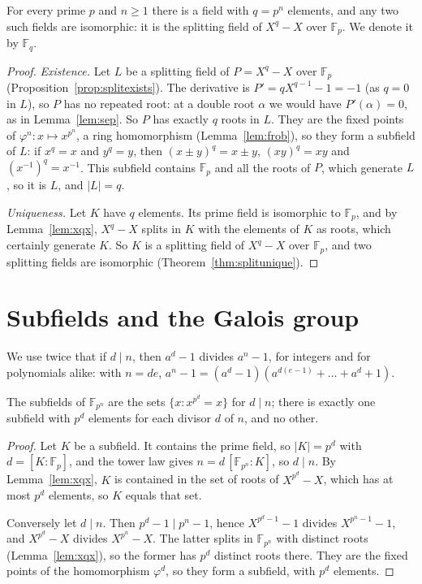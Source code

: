 \begin{theorem}\label{thm:fq}
For every prime $p$ and $n\ge1$ there is a field with $q=p^n$ elements, and any two such fields are isomorphic: it is the splitting field of $X^q-X$ over $\mathbb F_p$. We denote it by $\mathbb F_q$.
\end{theorem}
\begin{proof}
\emph{Existence.} Let $L$ be a splitting field of $P=X^q-X$ over $\mathbb F_p$ (Proposition~\ref{prop:splitexists}). The derivative is $P'=qX^{q-1}-1=-1$ (as $q=0$ in $L$), so $P$ has no repeated root: at a double root $\alpha$ we would have $P'(\alpha)=0$, as in Lemma~\ref{lem:sep}. So $P$ has exactly $q$ roots in $L$. They are the fixed points of $\varphi^n:x\mapsto x^{p^n}$, a ring homomorphism (Lemma~\ref{lem:frob}), so they form a subfield of $L$: if $x^q=x$ and $y^q=y$, then $(x\pm y)^q=x\pm y$, $(xy)^q=xy$ and $(x^{-1})^q=x^{-1}$. This subfield contains $\mathbb F_p$ and all the roots of $P$, which generate $L$, so it is $L$, and $|L|=q$.

\emph{Uniqueness.} Let $K$ have $q$ elements. Its prime field is isomorphic to $\mathbb F_p$, and by Lemma~\ref{lem:xqx}, $X^q-X$ splits in $K$ with the elements of $K$ as roots, which certainly generate $K$. So $K$ is a splitting field of $X^q-X$ over $\mathbb F_p$, and two splitting fields are isomorphic (Theorem~\ref{thm:splitunique}).
\end{proof}

\section{Subfields and the Galois group}

We use twice that if $d\mid n$, then $a^d-1$ divides $a^n-1$, for integers and for polynomials alike: with $n=de$, $a^n-1=(a^d-1)(a^{d(e-1)}+\dots+a^d+1)$.

\begin{theorem}\label{thm:subfields}
The subfields of $\mathbb F_{p^n}$ are the sets $\{x:x^{p^d}=x\}$ for $d\mid n$; there is exactly one subfield with $p^d$ elements for each divisor $d$ of $n$, and no other.
\end{theorem}
\begin{proof}
Let $K$ be a subfield. It contains the prime field, so $|K|=p^d$ with $d=[K:\mathbb F_p]$, and the tower law gives $n=d\,[\mathbb F_{p^n}:K]$, so $d\mid n$. By Lemma~\ref{lem:xqx}, $K$ is contained in the set of roots of $X^{p^d}-X$, which has at most $p^d$ elements, so $K$ equals that set.

Conversely let $d\mid n$. Then $p^d-1\mid p^n-1$, hence $X^{p^d-1}-1$ divides $X^{p^n-1}-1$, and $X^{p^d}-X$ divides $X^{p^n}-X$. The latter splits in $\mathbb F_{p^n}$ with distinct roots (Lemma~\ref{lem:xqx}), so the former has $p^d$ distinct roots there. They are the fixed points of the homomorphism $\varphi^d$, so they form a subfield, with $p^d$ elements.
\end{proof}

